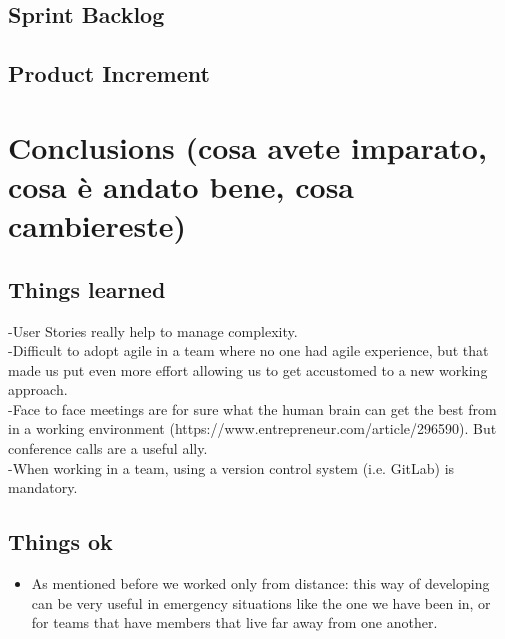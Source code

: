 \documentclass[a4paper,10pt]{report}
\begin{document}
\section{Sprint Backlog}
\section{Product Increment}
\chapter{Conclusions (cosa avete imparato, cosa è andato bene, cosa cambiereste)}
\section{Things learned}
-User Stories really help to manage complexity.\\
-Difficult to adopt agile in a team where no one had agile experience, but that made us put even more effort allowing us to get accustomed to a new working approach.\\
-Face to face meetings are for sure what the human brain can get the best from in a working environment (https://www.entrepreneur.com/article/296590). But conference calls are a useful ally.\\
-When working in a team, using a version control system (i.e. GitLab) is mandatory.\\
\section{Things ok}
\begin{itemize}
	\item As mentioned before we worked only from distance: this way of developing can be very useful in emergency situations like the one we have been in, or for teams that have members that live far away from one another.\\

\end{itemize}
\end{document}

